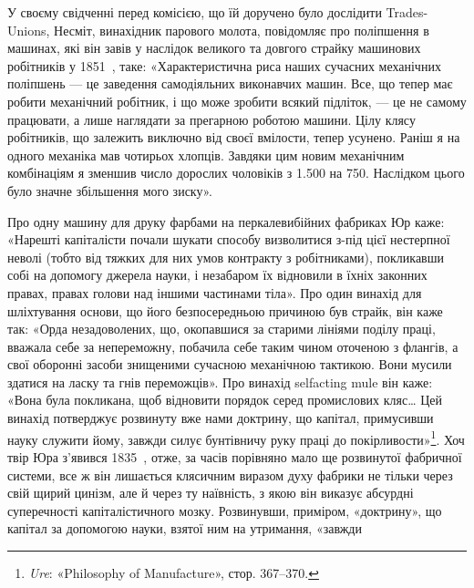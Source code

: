 У своєму свідченні перед комісією, що їй доручено було дослідити
Trades-Unions, Несміт, винахідник парового молота, повідомляє
про поліпшення в машинах, які він завів у наслідок
великого та довгого страйку машинових робітників у 1851~,
таке: «Характеристична риса наших сучасних механічних поліпшень
— це заведення самодіяльних виконавчих машин. Все, що
тепер має робити механічний робітник, і що може зробити всякий
підліток, — це не самому працювати, а лише наглядати за прегарною
роботою машини. Цілу клясу робітників, що залежить
виключно від своєї вмілости, тепер усунено. Раніш я на одного
механіка мав чотирьох хлопців. Завдяки цим новим механічним
комбінаціям я зменшив число дорослих чоловіків з \num{1.500} на 750.
Наслідком цього було значне збільшення мого зиску».

Про одну машину для друку фарбами на перкалевибійних
фабриках Юр каже: «Нарешті капіталісти почали шукати способу
визволитися з-під цієї нестерпної неволі (тобто від тяжких
для них умов контракту з робітниками), покликавши собі на допомогу
джерела науки, і незабаром їх відновили в їхніх законних
правах, правах голови над іншими частинами тіла». Про один
винахід для шліхтування основи, що його безпосередньою причиною
був страйк, він каже так: «Орда незадоволених, що, окопавшися
за старими лініями поділу праці, вважала себе за непереможну,
побачила себе таким чином оточеною з флангів, а свої
оборонні засоби знищеними сучасною механічною тактикою. Вони
мусили здатися на ласку та гнів переможців». Про винахід
selfacting mule він каже: «Вона була покликана, щоб відновити
порядок серед промислових кляс\dots{} Цей винахід потверджує
розвинуту вже нами доктрину, що капітал, примусивши науку
служити йому, завжди силує бунтівничу руку праці до покірливости»\footnote{
\emph{Ure}: «Philosophy of Manufacture», стор. 367--370.
}. Хоч твір Юра з’явився 1835~, отже, за часів порівняно
мало ще розвинутої фабричної системи, все ж він лишається клясичним
виразом духу фабрики не тільки через свій щирий цинізм,
але й через ту наївність, з якою він виказує абсурдні суперечності
капіталістичного мозку. Розвинувши, приміром, «доктрину»,
що капітал за допомогою науки, взятої ним на утримання, «завжди
\parbreak{}  %
